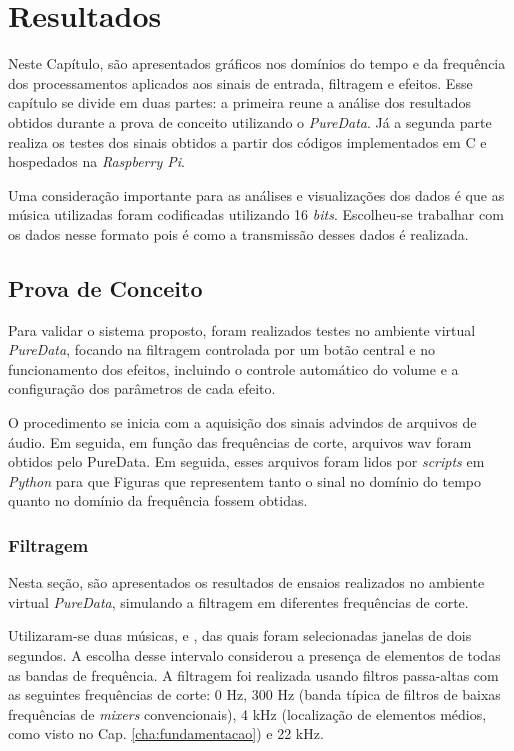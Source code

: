 \chapter[Resultados]{Resultados}
\label{sec:Resultados}

Neste Capítulo, são apresentados %
gráficos nos domínios do tempo e da frequência dos processamentos aplicados aos sinais de entrada, filtragem e efeitos. Esse capítulo se divide em duas partes: a primeira reune a análise dos resultados obtidos durante a prova de conceito utilizando o \textit{PureData}. Já a segunda parte realiza os testes dos sinais obtidos a partir dos códigos implementados em C e hospedados na \textit{Raspberry Pi}.

Uma consideração importante para as análises e visualizações dos dados é que as música utilizadas foram codificadas utilizando 16 \textit{bits}.%
Escolheu-se trabalhar com os dados nesse formato pois é como a transmissão desses dados é realizada.

\section{Prova de Conceito}

Para validar o sistema proposto, foram realizados testes no ambiente virtual \textit{PureData}, focando na filtragem controlada por um botão central e no funcionamento dos efeitos, incluindo o controle automático do volume e a configuração dos parâmetros de cada efeito.

O procedimento se inicia com a aquisição dos sinais advindos de arquivos de áudio. Em seguida, em função das frequências de corte, arquivos wav foram obtidos pelo PureData. Em seguida, esses arquivos foram lidos por \textit{scripts} em \textit{Python} para que Figuras que representem tanto o sinal no domínio do tempo quanto no domínio da frequência fossem obtidas. 

\subsection{Filtragem}

Nesta seção, são apresentados os resultados de ensaios realizados no ambiente virtual \textit{PureData}, simulando a filtragem em diferentes frequências de corte.

Utilizaram-se duas músicas, \cite{track01} e \cite{track02}, das quais foram selecionadas janelas de dois segundos. A escolha desse intervalo considerou a presença de elementos de todas as bandas de frequência. A filtragem foi realizada usando filtros passa-altas com as seguintes frequências de corte: 0 Hz, 300 Hz (banda típica de filtros de baixas frequências de \textit{mixers} convencionais), 4 kHz (localização de elementos médios, como visto no Cap. \ref{cha:fundamentacao}) e 22 kHz.

